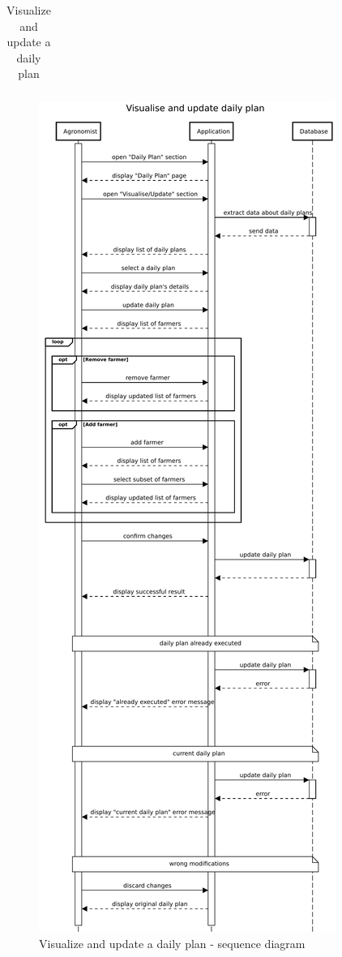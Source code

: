 \begin{table}[H]
\begin{tabular}[c]{|l|p{}|}
    	\hline %
        
    \end{tabular}
    \caption{\label{tab:daily_plan_section_access}Visualize and update a daily plan}
\end{table}

\begin{figure}[H]
    \centering
    \includegraphics[scale=0.45]{Images/Sequence diagrams/Agronomist - visualise and update daily plan.pdf}
    \caption{Visualize and update a daily plan - sequence diagram}
    \label{fig:my_label}
\end{figure}

